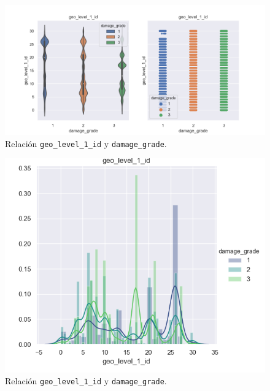 \documentclass[a4paper, 20pt]{article}
\begin{document}
\begin{figure}[H]
    \centering
    \includegraphics[height=0.8\textwidth, width=1.0\textwidth]{geo_level_1_1}
    \caption{Relación \texttt{geo\_level\_1\_id} y \texttt{damage\_grade}.}
    \label{fig:geo11}
\end{figure}

\begin{figure}[h]
    \centering
    \includegraphics[height=0.8\textwidth, width=1.0\textwidth]{geo_level_1_2}
    \caption{Relación \texttt{geo\_level\_1\_id} y \texttt{damage\_grade}.}
    \label{fig:geo12}
\end{figure}
\end{document}
